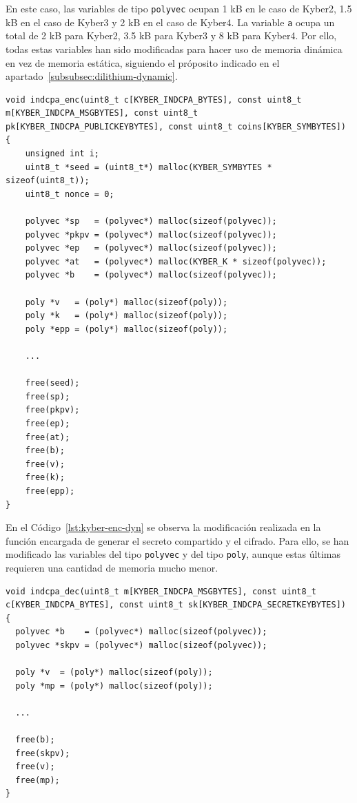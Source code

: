 En este caso, las variables de tipo \texttt{polyvec} ocupan 1 kB en le caso de Kyber2, 1.5 kB en el caso de Kyber3 y 2 kB en el caso de Kyber4.
La variable \texttt{a} ocupa un total de 2 kB para Kyber2, 3.5 kB para Kyber3 y 8 kB para Kyber4.
Por ello, todas estas variables han sido modificadas para hacer uso de memoria dinámica en vez de memoria estática, siguiendo el próposito indicado en el apartado~\ref{subsubsec:dilithium-dynamic}.

\begin{lstlisting}[label={lst:kyber-enc-dyn},style=Cnice,firstnumber=1,caption={Modificación de la función \texttt{indcpa\_enc} en el archivo \texttt{Kyber/main/src/indcpa.c}.}]
void indcpa_enc(uint8_t c[KYBER_INDCPA_BYTES], const uint8_t m[KYBER_INDCPA_MSGBYTES], const uint8_t pk[KYBER_INDCPA_PUBLICKEYBYTES], const uint8_t coins[KYBER_SYMBYTES])
{
    unsigned int i;
    uint8_t *seed = (uint8_t*) malloc(KYBER_SYMBYTES * sizeof(uint8_t));
    uint8_t nonce = 0;

    polyvec *sp   = (polyvec*) malloc(sizeof(polyvec));
    polyvec *pkpv = (polyvec*) malloc(sizeof(polyvec));
    polyvec *ep   = (polyvec*) malloc(sizeof(polyvec));
    polyvec *at   = (polyvec*) malloc(KYBER_K * sizeof(polyvec));
    polyvec *b    = (polyvec*) malloc(sizeof(polyvec));

    poly *v   = (poly*) malloc(sizeof(poly));
    poly *k   = (poly*) malloc(sizeof(poly));
    poly *epp = (poly*) malloc(sizeof(poly));

    ...

    free(seed);
    free(sp);
    free(pkpv);
    free(ep);
    free(at);
    free(b);
    free(v);
    free(k);
    free(epp);
}
\end{lstlisting}

En el Código~\ref{lst:kyber-enc-dyn} se observa la modificación realizada en la función encargada de generar el secreto compartido y el cifrado.
Para ello, se han modificado las variables del tipo \texttt{polyvec} y del tipo \texttt{poly}, aunque estas últimas requieren una cantidad de memoria mucho menor.

\begin{lstlisting}[label={lst:kyber-dec-dyn},style=Cnice,firstnumber=1,caption={Modificación de la función \texttt{indcpa\_dec} en el archivo \texttt{Kyber/main/src/indcpa.c}.}]
void indcpa_dec(uint8_t m[KYBER_INDCPA_MSGBYTES], const uint8_t c[KYBER_INDCPA_BYTES], const uint8_t sk[KYBER_INDCPA_SECRETKEYBYTES])
{
  polyvec *b    = (polyvec*) malloc(sizeof(polyvec));
  polyvec *skpv = (polyvec*) malloc(sizeof(polyvec));

  poly *v  = (poly*) malloc(sizeof(poly));
  poly *mp = (poly*) malloc(sizeof(poly));

  ...

  free(b);
  free(skpv);
  free(v);
  free(mp);
}
\end{lstlisting}

